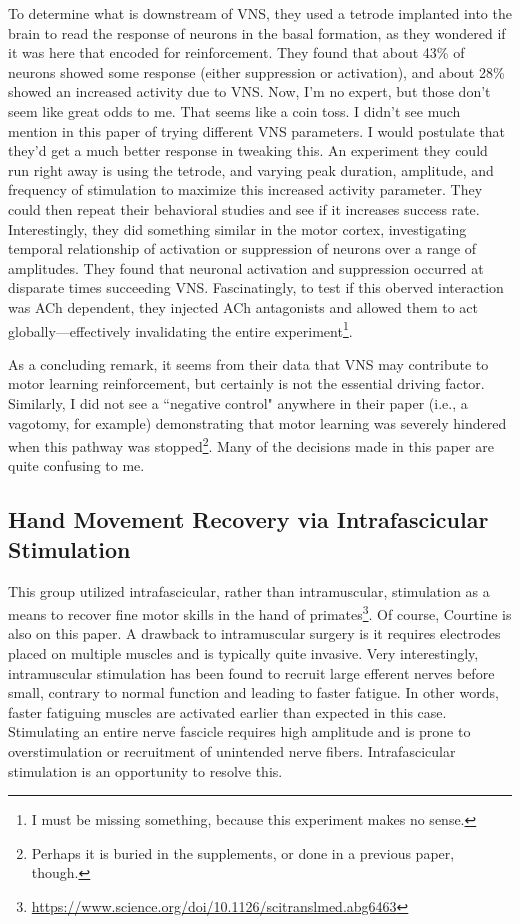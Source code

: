 \documentclass[12pt]{report}
\begin{document}
To determine what is downstream of VNS, they used a tetrode implanted into the brain to read the response of neurons in the basal formation, as they wondered if it was here that encoded for reinforcement. They found that about 43\% of neurons showed some response (either suppression or activation), and about 28\% showed an increased activity due to VNS. Now, I'm no expert, but those don't seem like great odds to me. That seems like a coin toss. I didn't see much mention in this paper of trying different VNS parameters. I would postulate that they'd get a much better response in tweaking this. An experiment they could run right away is using the tetrode, and varying peak duration, amplitude, and frequency of stimulation to maximize this increased activity parameter. They could then repeat their behavioral studies and see if it increases success rate. Interestingly, they did something similar in the motor cortex, investigating temporal relationship of activation or suppression of neurons over a range of amplitudes. They found that neuronal activation and suppression occurred at disparate times succeeding VNS. Fascinatingly, to test if this oberved interaction was ACh dependent, they injected ACh antagonists and allowed them to act globally---effectively invalidating the entire experiment\footnote{I must be missing something, because this experiment makes no sense.}.\newline

As a concluding remark, it seems from their data that VNS may contribute to motor learning reinforcement, but certainly is not the essential driving factor. Similarly, I did not see a ``negative control" anywhere in their paper (i.e., a vagotomy, for example) demonstrating that motor learning was severely hindered when this pathway was stopped\footnote{Perhaps it is buried in the supplements, or done in a previous paper, though.}. Many of the decisions made in this paper are quite confusing to me. 

\subsection{Hand Movement Recovery via Intrafascicular Stimulation}

This group utilized intrafascicular, rather than intramuscular, stimulation as a means to recover fine motor skills in the hand of primates\footnote{\url{https://www.science.org/doi/10.1126/scitranslmed.abg6463}}. Of course, Courtine is also on this paper. A drawback to intramuscular surgery is it requires electrodes placed on multiple muscles and is typically quite invasive. Very interestingly, intramuscular stimulation has been found to recruit large efferent nerves before small, contrary to normal function and leading to faster fatigue. In other words, faster fatiguing muscles are activated earlier than expected in this case. Stimulating an entire nerve fascicle requires high amplitude and is prone to overstimulation or recruitment of unintended nerve fibers. Intrafascicular stimulation is an opportunity to resolve this.\newline
\end{document}
